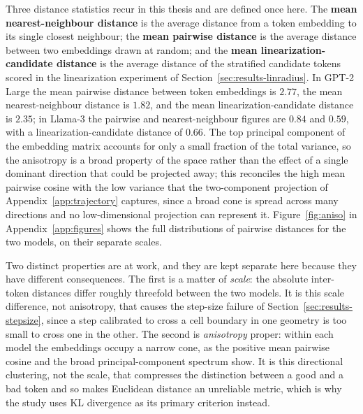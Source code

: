 Three distance statistics recur in this thesis and are defined once here. The \textbf{mean nearest-neighbour distance} is the average distance from a token embedding to its single closest neighbour; the \textbf{mean pairwise distance} is the average distance between two embeddings drawn at random; and the \textbf{mean linearization-candidate distance} is the average distance of the stratified candidate tokens scored in the linearization experiment of Section~\ref{sec:results-linradius}. In GPT-2 Large the mean pairwise distance between token embeddings is $2.77$, the mean nearest-neighbour distance is $1.82$, and the mean linearization-candidate distance is $2.35$; in Llama-3 the pairwise and nearest-neighbour figures are $0.84$ and $0.59$, with a linearization-candidate distance of $0.66$.
The top principal component of the embedding matrix accounts for only a small fraction of the total variance, so the anisotropy is a broad property of the space rather than the effect of a single dominant direction that could be projected away; this reconciles the high mean pairwise cosine with the low variance that the two-component projection of Appendix~\ref{app:trajectory} captures, since a broad cone is spread across many directions and no low-dimensional projection can represent it.
Figure~\ref{fig:aniso} in Appendix~\ref{app:figures} shows the full distributions of pairwise distances for the two models, on their separate scales.

Two distinct properties are at work, and they are kept separate here because they have different consequences. The first is a matter of \emph{scale}: the absolute inter-token distances differ roughly threefold between the two models. It is this scale difference, not anisotropy, that causes the step-size failure of Section~\ref{sec:results-stepsize}, since a step calibrated to cross a cell boundary in one geometry is too small to cross one in the other. The second is \emph{anisotropy} proper: within each model the embeddings occupy a narrow cone, as the positive mean pairwise cosine and the broad principal-component spectrum show. It is this directional clustering, not the scale, that compresses the distinction between a good and a bad token and so makes Euclidean distance an unreliable metric, which is why the study uses KL divergence as its primary criterion instead.

